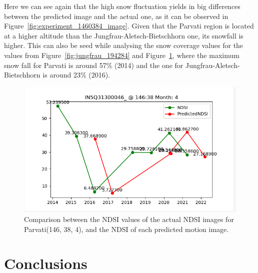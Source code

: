 \documentclass[12pt, a4paper]{report}
\begin{document}
	
	Here we can see again that the high snow fluctuation yields in big differences between the predicted image and the actual one, as it can be observed in Figure~\ref{fig:experiment_1460384_image}. Given that the Parvati region is located at a higher altitude than the Jungfrau-Aletsch-Bietschhorn one, its snowfall is higher. This can also be seed while analysing the snow coverage values for the values from Figure~\ref{fig:jungfrau_194284} and Figure~\ref{fig:parvati_146384}, where the maximum snow fall for Parvati is around 57\% (2014) and the one for Jungfrau-Aletsch-Bietschhorn is around 23\% (2016).

	\begin{figure}[h!]
		\centering
		\includegraphics[scale=0.5]{../images/experiment_146385.png}
		\caption{Comparison between the NDSI values of the actual NDSI images for Parvati(146, 38, 4), and the NDSI of each predicted motion image.}
		\label{fig:parvati_146384}
	\end{figure}
	

	\newpage{}	
	\chapter{Conclusions}
	\label{seq:conclusions}
	
\end{document}
